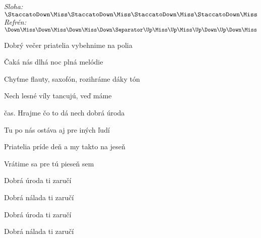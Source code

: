 \begin{song}


\begin{headerbox}
\RaiseBoxWithChucks
\textit{Sloha:} $\StaccatoDown\Miss\StaccatoDown\Miss\StaccatoDown\Miss\StaccatoDown\Miss$ \quad
\textit{Refrén:} $\Down\Miss\Down\Miss\Down\Miss\Down \Separator \Up\Miss\Up\Miss\Up\Down\Up\Down\Miss$
\end{headerbox}

\begin{hchordbox}
\par
{}
\end{hchordbox}

\Large

\bigskip

Dobrý večer priatelia vybehnime na polia \par
Čaká nás  dlhá noc plná melódie \par
{}Chyťme flauty, saxofón, rozihráme dáky tón \par
{}Nech lesné víly tancujú, veď máme

\bigskip

čas. Hrajme čo to dá  nech dobrá úroda \par
Tu po nás  ostáva aj pre iných ľudí \par
{} Priatelia príde deň  a my takto na jeseň \par
{} Vrátime sa pre tú pieseň sem \par

\bigskip

Dobrá úroda ti zaručí \par
{}Dobrá nálada ti zaručí    \par
{}Dobrá úroda ti zaručí \par
{}Dobrá nálada ti zaručí    \par

\bigskip


\bigskip


\bigskip


\vfill

\end{song}
